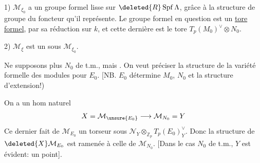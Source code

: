 1) $\mathcal M_{\xi_0}$ a  un groupe formel
lisse sur $\deleted{R}\operatorname{Spf}\Lambda$,
grâce à la structure de groupe du foncteur qu'il représente.
Le groupe formel en question est un \uline{tore formel},
 
par sa réduction sur $k$, et cette dernière est le tore
 $T_p(M_0)^\vee\otimes N_0$.

2) $\mathcal M_\xi$ est un 
 sous $\mathcal M_{\xi_0}$.

Ne supposons plus $N_0$ de t.m., mais .
On veut préciser la structure de la variété formelle des
modules pour $E_0$. [NB. $E_0$ détermine 
$M_0$, $N_0$ et la structure d'extension!)

On a un hom naturel
\[
X=\mathcal M_{\unsure{E_0}}\longrightarrow\mathcal M_{N_0}=Y
\]
Ce dernier fait de $\mathcal M_{E_0}$ un
 torseur 
sous $\mathcal N_Y\otimes_{\mathbb Z_p}T_p(E_0)^\vee_Y$.
Donc la structure de $\deleted{X}\mathcal M_{E_0}$ est ramenée
à celle de $\mathcal M_{N_0}$.
[Dans le cas $N_0$ de t.m., $Y$ est évident: un point].
